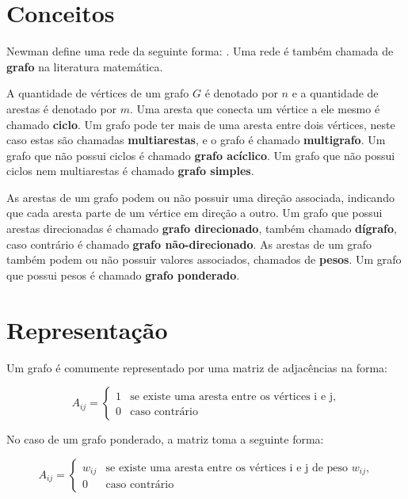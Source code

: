 
\section{Conceitos}
\label{section:redes:conceitos}

Newman \cite{newman:2018:networks} define uma rede da seguinte forma: .  Uma rede é também chamada de \textbf{grafo} na literatura matemática.

A quantidade de vértices de um grafo $G$ é denotado por $n$ e a quantidade de arestas é denotado por $m$. Uma aresta que conecta um vértice a ele mesmo é chamado \textbf{ciclo}. Um grafo pode ter mais de uma aresta entre dois vértices, neste caso estas são chamadas \textbf{multiarestas}, e o grafo é chamado \textbf{multigrafo}. Um grafo que não possui ciclos é chamado \textbf{grafo acíclico}. Um grafo que não possui ciclos nem multiarestas é chamado \textbf{grafo simples}.

As arestas de um grafo podem ou não possuir uma direção associada, indicando que cada aresta parte de um vértice em direção a outro. Um grafo que possui arestas direcionadas é chamado \textbf{grafo direcionado}, também chamado \textbf{dígrafo}, caso contrário é chamado \textbf{grafo não-direcionado}. As arestas de um grafo também podem ou não possuir valores associados, chamados de \textbf{pesos}. Um grafo que possui pesos é chamado \textbf{grafo ponderado}.

\section{Representação}
\label{section:redes:representacao}

Um grafo é comumente representado por uma matriz de adjacências na forma:

\begin{equation}
A_{ij} = \begin{cases}
1 & \mbox{se existe uma aresta entre os vértices i e j,}\\
0 & \mbox{caso contrário}
\end{cases}
\end{equation}

No caso de um grafo ponderado, a matriz toma a seguinte forma:

\begin{equation}
A_{ij} = \begin{cases}
w_{ij} & \mbox{se existe uma aresta entre os vértices i e j de peso $w_{ij}$,}\\
0 & \mbox{caso contrário}
\end{cases}
\end{equation}

